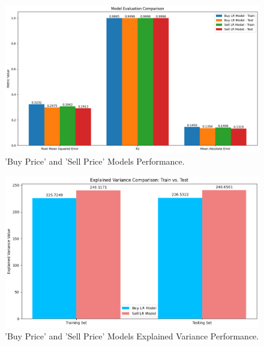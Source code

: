 \begin{figure}[H]
    \centering
    \includegraphics[width=\linewidth]{images/rmse_r2_mae}
    \caption{'Buy Price' and 'Sell Price' Models Performance.}
    \label{fig:rmse_r2_mae}
\end{figure}

\begin{figure}[H]
    \centering
    \includegraphics[width=0.8\linewidth]{images/train_test_var}
    \caption{'Buy Price' and 'Sell Price' Models Explained Variance Performance.}
    \label{fig:train_test_var}
\end{figure}